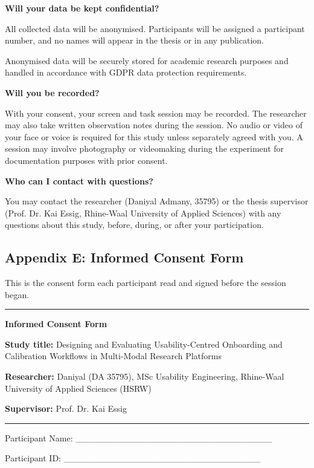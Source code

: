 \documentclass[
]{article}
\begin{document}
\textbf{Will your data be kept confidential?}

All collected data will be anonymised. Participants will be assigned a participant number, and no names will appear in the thesis or in any publication.

Anonymised data will be securely stored for academic research purposes and handled in accordance with GDPR data protection requirements.

\textbf{Will you be recorded?}

With your consent, your screen and task session may be recorded. The researcher may also take written observation notes during the session. No audio or video of your face or voice is required for this study unless separately agreed with you. A session may involve photography or videomaking during the experiment for documentation purposes with prior consent.

\textbf{Who can I contact with questions?}

You may contact the researcher (Daniyal Admany, 35795) or the thesis supervisor (Prof. Dr. Kai Essig, Rhine-Waal University of Applied Sciences) with any questions about this study, before, during, or after your participation.

\clearpage
\hypertarget{appendix-d-informed-consent-form}{%
\subsection{Appendix E: Informed Consent Form}\label{appendix-d-informed-consent-form}}

This is the consent form each participant read and signed before the session began.

\noindent\rule{\linewidth}{0.4pt}

\textbf{Informed Consent Form}

\textbf{Study title:} Designing and Evaluating Usability-Centred Onboarding and Calibration Workflows in Multi-Modal Research Platforms

\textbf{Researcher:} Daniyal (DA 35795), MSc Usability Engineering, Rhine-Waal University of Applied Sciences (HSRW)

\textbf{Supervisor:} Prof. Dr. Kai Essig

\noindent\rule{\linewidth}{0.4pt}

Participant Name: \_\_\_\_\_\_\_\_\_\_\_\_\_\_\_\_\_\_\_\_\_\_\_\_\_\_\_\_\_\_\_

Participant ID: \_\_\_\_\_\_\_\_\_\_\_\_\_\_\_\_\_\_\_\_\_\_\_\_\_\_\_\_\_\_\_
\end{document}
